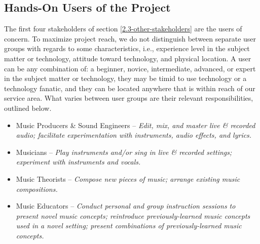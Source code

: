\documentclass[12pt]{article}
\begin{document}
\subsection{Hands-On Users of the Project} \label{2.4-hands-on-users}
The first four stakeholders of section \ref{2.3-other-stakeholders} are the users of concern. To maximize project reach, we do not distinguish between separate user groups with regards to some characteristics, i.e., experience level in the subject matter or technology, attitude toward technology, and physical location. A user can be any combination of: a beginner, novice, intermediate, advanced, or expert in the subject matter or technology, they may be timid to use technology or a technology fanatic, and they can be located anywhere that is within reach of our service area. What varies between user groups are their relevant responsibilities, outlined below.
\begin{itemize}
  \item Music Producers \& Sound Engineers -- \emph{Edit, mix, and master live \& recorded audio; facilitate experimentation with instruments, audio effects, and lyrics.}
  \item Musicians -- \emph{Play instruments and/or sing in live \& recorded settings; experiment with instruments and vocals.}
  \item Music Theorists -- \emph{Compose new pieces of music; arrange existing music compositions.}
  \item Music Educators -- \emph{Conduct personal and group instruction sessions to present novel music concepts; reintroduce previously-learned music concepts used in a novel setting; present combinations of previously-learned music concepts.}
\end{itemize}
\end{document}
